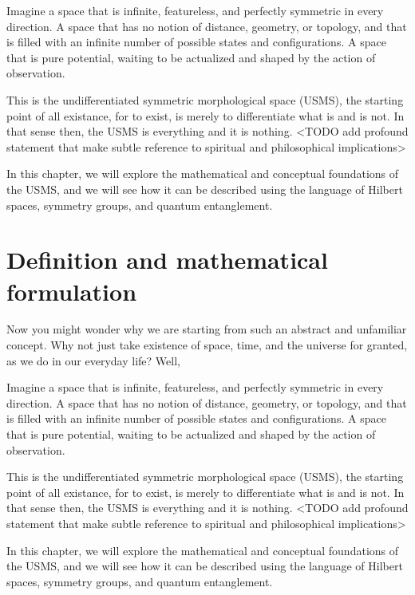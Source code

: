 \begin{figure}[h]
    \label{fig:inflation}
\end{figure}%
Imagine a space that is infinite, featureless, and perfectly symmetric in every direction. A space that has no notion of distance, geometry, or topology, and that is filled with an infinite number of possible states and configurations. A space that is pure potential, waiting to be actualized and shaped by the action of observation.

This is the undifferentiated symmetric morphological space (USMS), the starting point of all existance, for to exist, is merely to differentiate what is and is not. In that sense then, the USMS is everything and it is nothing. <TODO add profound statement that make subtle reference to spiritual and philosophical implications>

In this chapter, we will explore the mathematical and conceptual foundations of the USMS, and we will see how it can be described using the language of Hilbert spaces, symmetry groups, and quantum entanglement.

\section{Definition and mathematical formulation}

Now you might wonder why we are starting from such an abstract and unfamiliar concept. Why not just take existence of space, time, and the universe for granted, as we do in our everyday life? Well,


Imagine a space that is infinite, featureless, and perfectly symmetric in every direction. A space that has no notion of distance, geometry, or topology, and that is filled with an infinite number of possible states and configurations. A space that is pure potential, waiting to be actualized and shaped by the action of observation.

This is the undifferentiated symmetric morphological space (USMS), the starting point of all existance, for to exist, is merely to differentiate what is and is not. In that sense then, the USMS is everything and it is nothing. <TODO add profound statement that make subtle reference to spiritual and philosophical implications>

In this chapter, we will explore the mathematical and conceptual foundations of the USMS, and we will see how it can be described using the language of Hilbert spaces, symmetry groups, and quantum entanglement.

